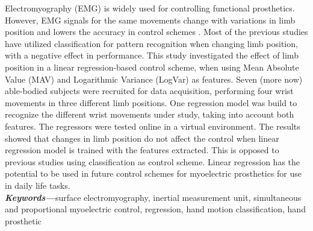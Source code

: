 Electromyography (EMG) is widely used for controlling functional prosthetics. However, EMG signals for the same movements change with variations in limb position and lowers the accuracy in control schemes \cite{fougner2012}. Most of the previous studies have utilized classification for pattern recognition when changing limb position, with a negative effect in performance. %
This study investigated the effect of limb position in a linear regression-based control scheme, when using 
Mean Absolute Value (MAV) and Logarithmic Variance (LogVar) as features. %
Seven (more now) able-bodied subjects were recruited for data acquisition, performing four wrist movements in three different limb positions. One regression model was build to recognize the different wrist movements under study, taking into account both features. %
The regressors were tested online in a virtual environment. %
The results showed that changes in limb position do not affect the control when linear regression model is trained with the %
features extracted. This is opposed to previous studies using classification as control scheme. Linear regression has the potential to be used in future control schemes for myoelectric prosthetics for use in daily life tasks.\\


\textit{\textbf{Keywords---}}surface electromyography, inertial measurement unit, simultaneous and proportional myoelectric control, regression, hand motion classification, hand prosthetic

